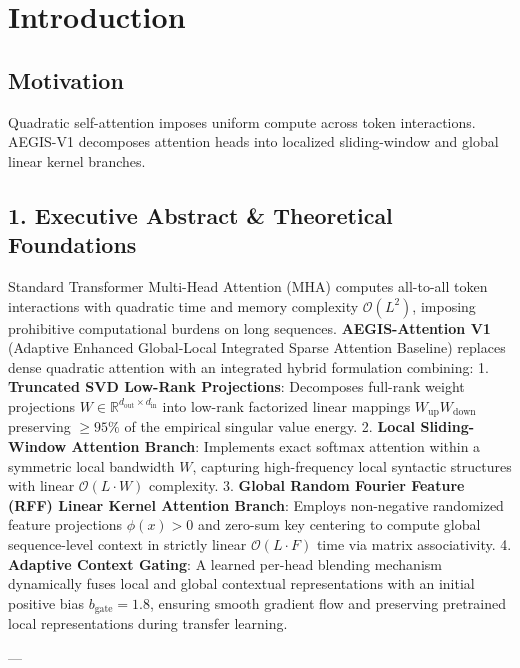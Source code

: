 \section{Introduction}\subsection{Motivation}Quadratic self-attention imposes uniform compute across token interactions. AEGIS-V1 decomposes attention heads into localized sliding-window and global linear kernel branches.



\subsection{1. Executive Abstract \& Theoretical Foundations}
Standard Transformer Multi-Head Attention (MHA) computes all-to-all token interactions with quadratic time and memory complexity $\mathcal{O}(L^2)$, imposing prohibitive computational burdens on long sequences. \textbf{AEGIS-Attention V1} (Adaptive Enhanced Global-Local Integrated Sparse Attention Baseline) replaces dense quadratic attention with an integrated hybrid formulation combining:
1. \textbf{Truncated SVD Low-Rank Projections}: Decomposes full-rank weight projections $W \in \mathbb{R}^{d_{\text{out}} \times d_{\text{in}}}$ into low-rank factorized linear mappings $W_{\text{up}} W_{\text{down}}$ preserving $\ge 95\%$ of the empirical singular value energy.
2. \textbf{Local Sliding-Window Attention Branch}: Implements exact softmax attention within a symmetric local bandwidth $W$, capturing high-frequency local syntactic structures with linear $\mathcal{O}(L \cdot W)$ complexity.
3. \textbf{Global Random Fourier Feature (RFF) Linear Kernel Attention Branch}: Employs non-negative randomized feature projections $\phi(x) > 0$ and zero-sum key centering to compute global sequence-level context in strictly linear $\mathcal{O}(L \cdot F)$ time via matrix associativity.
4. \textbf{Adaptive Context Gating}: A learned per-head blending mechanism dynamically fuses local and global contextual representations with an initial positive bias $b_{\text{gate}} = 1.8$, ensuring smooth gradient flow and preserving pretrained local representations during transfer learning.

---


